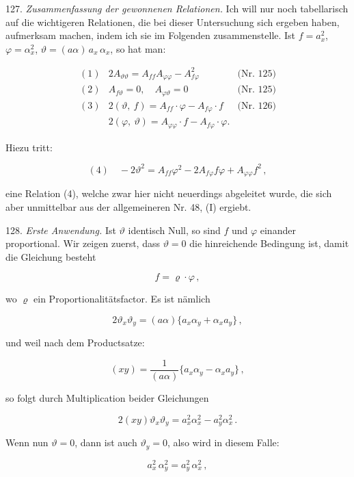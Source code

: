 127. \textit{Zusammenfassung der gewonnenen Relationen.} Ich will nur
noch tabellarisch auf die wichtigeren Relationen, die bei dieser Untersuchung sich ergeben haben, aufmerksam machen, indem ich sie im
Folgenden zusammenstelle. Ist $f = a_x^2$, $\varphi = \alpha_x^2$, $\vartheta = (a\alpha)\,a_x\,\alpha_x$, so
hat man:

\[
\begin{array}{rll}
(1) & 2A_{\vartheta\vartheta} = A_{ff}A_{\varphi\varphi} - A_{f\varphi}^2 & \text{(Nr. 125)} \\[4pt]
(2) & A_{f\vartheta} = 0,\quad A_{\varphi\vartheta} = 0 & \text{(Nr. 125)} \\[4pt]
(3) & 2(\vartheta,\ f) = A_{ff}\cdot\varphi - A_{f\varphi}\cdot f & \text{(Nr. 126)} \\[4pt]
    & 2(\varphi,\ \vartheta) = A_{\varphi\varphi}\cdot f - A_{f\varphi}\cdot\varphi. &
\end{array}
\]

Hiezu tritt:

\[
(4)\quad -2\vartheta^2 = A_{ff}\varphi^2 - 2A_{f\varphi}f\varphi + A_{\varphi\varphi}f^2\,,
\]

eine Relation (4), welche zwar hier nicht neuerdings abgeleitet wurde,
die sich aber unmittelbar aus der allgemeineren Nr. 48, (I) ergiebt.

128. \textit{Erste Anwendung.} Ist $\vartheta$ identisch Null, so sind $f$ und
$\varphi$ einander proportional. Wir zeigen zuerst, dass $\vartheta = 0$ die hinreichende Bedingung ist, damit die Gleichung besteht

\[
f = \varrho \cdot \varphi\,,
\]

wo $\varrho$ ein Proportionalitätsfactor. Es ist nämlich

\[
2\vartheta_x\vartheta_y = (a\alpha)\{a_x\alpha_y + \alpha_x a_y\}\,,
\]

und weil nach dem Productsatze:

\[
(xy) = \frac{1}{(a\alpha)}\{a_x\alpha_y - \alpha_x a_y\}\,,
\]

so folgt durch Multiplication beider Gleichungen

\[
2(xy)\vartheta_x\vartheta_y = a_x^2\alpha_x^2 - a_y^2\alpha_x^2\,.
\]



Wenn nun $\vartheta = 0$, dann ist auch $\vartheta_y = 0$, also wird in diesem Falle:

\[
a_x^2\,\alpha_y^2 = a_y^2\,\alpha_x^2\,,
\]


